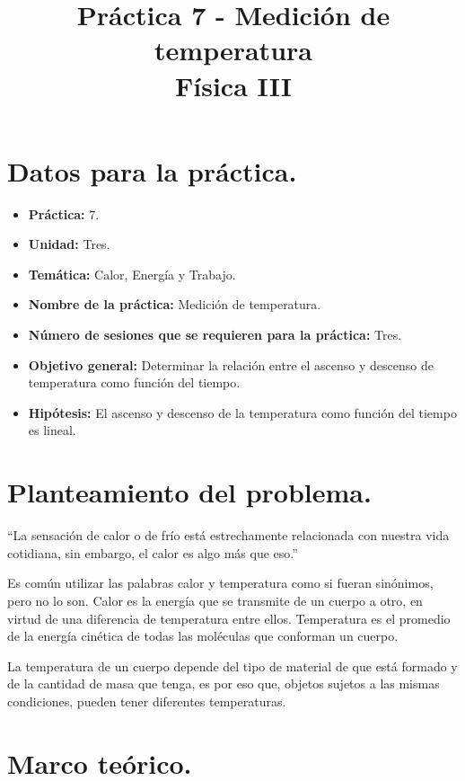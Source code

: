 \documentclass[14pt]{extarticle}
\title{\vspace*{-2cm} Práctica 7 - Medición de temperatura \\  Física III \vspace{-5ex}}
\date{}
\begin{document}
\maketitle
\renewcommand{\tablename}{Tabla}

\section{Datos para la práctica.}

\begin{itemize}
\itemsep0em 
\item  \textbf{Práctica:} 7.
\item \textbf{Unidad:} Tres.
\item \textbf{Temática:} Calor, Energía y Trabajo.
\item \textbf{Nombre de la práctica:} Medición de temperatura.
\item \textbf{Número de sesiones que se requieren para la práctica:} Tres.
\item \textbf{Objetivo general: } Determinar la relación entre el ascenso y descenso de temperatura como función del tiempo.
\item \textbf{Hipótesis: } El ascenso y descenso de la temperatura como función del tiempo es lineal. 
\end{itemize}

\section{Planteamiento del problema.} 

\enquote{La sensación de calor o de frío está estrechamente relacionada con nuestra vida cotidiana, sin embargo, el calor es algo más que eso.}

Es común utilizar las palabras calor y temperatura como si fueran sinónimos, pero no lo son. Calor es la energía que se transmite de un cuerpo a otro, en virtud de una diferencia de temperatura entre ellos. Temperatura es el promedio de la energía cinética de todas las moléculas que conforman un cuerpo.

La temperatura de un cuerpo depende del tipo de material de que está formado y de la cantidad de masa que tenga, es por eso que, objetos sujetos a las mismas condiciones, pueden tener diferentes temperaturas.

\section{Marco teórico.}
\end{document}
